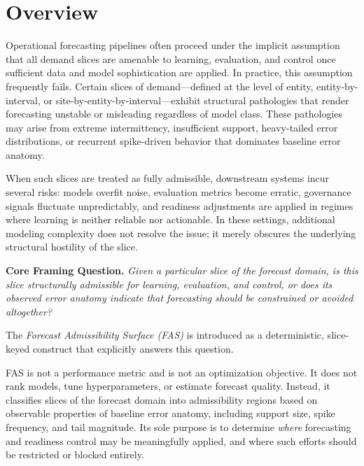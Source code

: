 
\section{Overview}
\label{sec:fas_overview}

Operational forecasting pipelines often proceed under the implicit assumption
that all demand slices are amenable to learning, evaluation, and control once
sufficient data and model sophistication are applied. In practice, this
assumption frequently fails. Certain slices of demand—defined at the level of
entity, entity-by-interval, or site-by-entity-by-interval—exhibit structural
pathologies that render forecasting unstable or misleading regardless of model
class. These pathologies may arise from extreme intermittency, insufficient
support, heavy-tailed error distributions, or recurrent spike-driven behavior
that dominates baseline error anatomy.

When such slices are treated as fully admissible, downstream systems incur
several risks: models overfit noise, evaluation metrics become erratic,
governance signals fluctuate unpredictably, and readiness adjustments are
applied in regimes where learning is neither reliable nor actionable. In these
settings, additional modeling complexity does not resolve the issue; it merely
obscures the underlying structural hostility of the slice.

\medskip
\begin{framed}
\noindent\textbf{Core Framing Question.}\;
\emph{Given a particular slice of the forecast domain, is this slice structurally
admissible for learning, evaluation, and control, or does its observed error
anatomy indicate that forecasting should be constrained or avoided altogether?}
\end{framed}
\medskip

The \emph{Forecast Admissibility Surface (FAS)} is introduced as a deterministic,
slice-keyed construct that explicitly answers this question.

FAS is not a performance metric and is not an optimization objective. It does not
rank models, tune hyperparameters, or estimate forecast quality. Instead, it
classifies slices of the forecast domain into admissibility regions based on
observable properties of baseline error anatomy, including support size, spike
frequency, and tail magnitude. Its sole purpose is to determine \emph{where}
forecasting and readiness control may be meaningfully applied, and where such
efforts should be restricted or blocked entirely.


